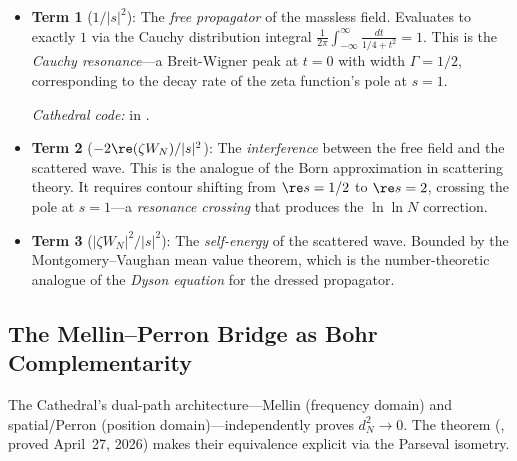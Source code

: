 \begin{correspondence}
\begin{itemize}
  \item \textbf{Term 1} ($1/|s|^2$): The \emph{free propagator} of the
    massless field. Evaluates to exactly $1$ via the Cauchy distribution
    integral $\frac{1}{2\pi}\int_{-\infty}^\infty \frac{dt}{1/4+t^2} = 1$.
    This is the \emph{Cauchy resonance}---a Breit-Wigner peak at $t=0$
    with width $\Gamma = 1/2$, corresponding to the decay rate of
    the zeta function's pole at $s=1$.

    \emph{Cathedral code:}  in .

  \item \textbf{Term 2} ($-2\re(\zeta W_N)/|s|^2$): The \emph{interference}
    between the free field and the scattered wave. This is the analogue of
    the Born approximation in scattering theory. It requires contour shifting
    from $\re s = 1/2$ to $\re s = 2$, crossing the pole at $s=1$---a
    \emph{resonance crossing} that produces the $\ln\ln N$ correction.

  \item \textbf{Term 3} ($|\zeta W_N|^2/|s|^2$): The \emph{self-energy}
    of the scattered wave. Bounded by the Montgomery--Vaughan mean value
    theorem, which is the number-theoretic analogue of the \emph{Dyson
    equation} for the dressed propagator.
\end{itemize}
\end{correspondence}

\subsection{The Mellin--Perron Bridge as Bohr Complementarity}

The Cathedral's dual-path architecture---Mellin (frequency domain) and
spatial/Perron (position domain)---independently proves $d_N^2 \to 0$.
The theorem 
(, proved April~27, 2026) makes their
equivalence explicit via the Parseval isometry.

